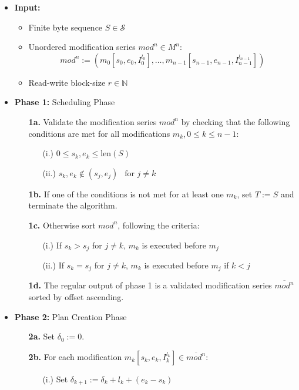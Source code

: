 \documentclass[english, 10pt, openright, twocolumn, landscape, twoside, notitlepage, a4paper, pdftex]		
{article}
\begin{document}
\begin{itemize}
\item \textbf{Input:}
\begin{itemize}
\item Finite byte sequence $S\in\mathcal{S}$
\item Unordered modification series $mod^{n}\in M^{n}$:
\[mod^{n}:=\left(m_{0}[s_{0}, e_{0}, I_{0}^{l_{0}}],\ldots,m_{n-1}[s_{n-1}, e_{n-1}, I_{n-1}^{l_{n-1}}]\right)\] 
\item Read-write block-size $r\in\mathbb{N}$
\end{itemize}
\item \textbf{Phase 1:} Scheduling Phase
\begin{enumerate}
\item[\textbf{1a.}] Validate the modification series $mod^{n}$ by checking that the following conditions are met for all modifications $m_{k}, 0\leq k\leq n-1$:
\begin{enumerate}
\item[(i.)] $0\leq s_{k},e_{k}\leq \text{len}(S)$
\item[(ii.)] $s_{k},e_{k}\notin(s_{j}, e_{j})\ \ \text{ for } j\neq k$
\end{enumerate}
\item [\textbf{1b.}] If one of the conditions is not met for at least one $m_{k}$, set $T:=S$ and terminate the algorithm.
\item [\textbf{1c.}] Otherwise sort $mod^{n}$, following the criteria:
\begin{enumerate}
\item[(i.)] If $s_{k}>s_{j}$ for $j\neq k$, $m_{k}$ is executed before $m_{j}$
\item[(ii.)] If $s_{k}=s_{j}$ for $j\neq k$, $m_{k}$ is executed before $m_{j}$ if $k<j$
\end{enumerate}
\item [\textbf{1d.}] The regular output of phase 1 is a validated modification series $\overline{mod^{n}}$ sorted by offset ascending.
\end{enumerate}
\item \textbf{Phase 2:} Plan Creation Phase
\begin{enumerate}
\item [\textbf{2a.}] Set $\delta_{0}:=0$.
\item [\textbf{2b.}] For each modification $m_{k}[s_{k}, e_{k}, I_{k}^{l_{k}}]\in\overline{mod^{n}}$:
\begin{enumerate}
\item [(i.)] Set $\delta_{k+1}:=\delta_{k}+l_{k}+(e_{k}-s_{k})$

\end{enumerate}
\end{enumerate}
\end{itemize}
\end{document}

